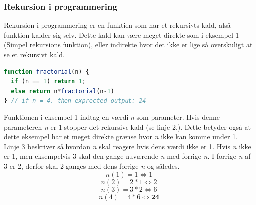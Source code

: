 \documentclass[12pt]{article}
\begin{document}
\subsubsection{Rekursion i programmering}
Rekursion i programmering er en funktion som har et rekursivts kald, alså funktion kalder sig selv. Dette kald kan være meget direkte som i eksempel 1 (Simpel rekursions funktion), eller indirekte hvor det ikke er lige så overskuligt at se et rekursivt kald.
\begin{lstlisting}[language=JavaScript, caption=Simpel rekursions funktion]
function fractorial(n) {        
  if (n == 1) return 1; 
  else return n*fractorial(n-1) 
} // if n = 4, then exprected output: 24
\end{lstlisting}
Funktionen i eksempel 1 indtag en værdi \textit{n} som parameter. Hvis denne parameteren \textit{n} er 1 stopper det rekursive kald (se linje 2.). Dette betyder også at dette eksempel har et meget direkte grænse hvor \textit{n} ikke kan komme under 1. Linje 3 beskriver så hvordan \textit{n} skal reagere hvis dens værdi ikke er 1. Hvis \textit{n} ikke er 1, men eksempelvis 3 skal den gange nuværende \textit{n} med forrige \textit{n}. I forrige \textit{n} af 3 er 2, derfor skal 2 ganges med dens forrige \textit{n} og således.
\[n(1) = 1 \Leftrightarrow 1\] 
\[n(2) = 2*1 \Leftrightarrow   2\]
\[n(3) = 3*2 \Leftrightarrow   6\]
\[n(4) = 4*6 \Leftrightarrow  \textbf{24}\]

\end{document}
